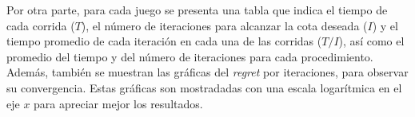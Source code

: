 Por otra parte, para cada juego se presenta una tabla que indica el tiempo de cada corrida ($T$), el número de iteraciones para alcanzar la cota deseada ($I$) y el tiempo promedio de cada iteración en cada una de las corridas ($T/I$), así como el promedio del tiempo y del número de iteraciones para cada procedimiento. Además, también se muestran las gráficas del \textit{regret} por iteraciones, para observar su convergencia. Estas gráficas son mostradadas con una escala logarítmica en el eje $x$ para apreciar mejor los resultados.






